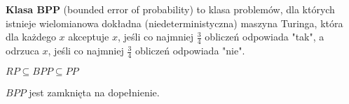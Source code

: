 \begin{definicja}
    \textbf{Klasa BPP} (bounded error of probability) to klasa problemów, dla których istnieje wielomianowa dokładna
    (niedeterministyczna) maszyna Turinga, która dla każdego $x$ akceptuje $x$, jeśli co najmniej $\frac{3}{4}$ obliczeń
    odpowiada "tak", a odrzuca $x$, jeśli co najmniej $\frac{3}{4}$ obliczeń odpowiada "nie".
\end{definicja}

\begin{lemat}
    $RP \subseteq BPP \subseteq PP$
\end{lemat}

\begin{lemat}
    $BPP$ jest zamknięta na dopełnienie.
\end{lemat}